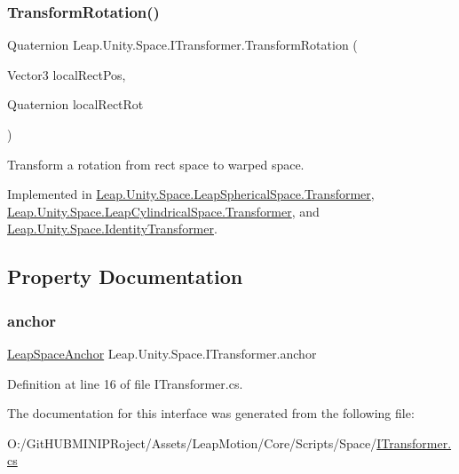\subsubsection{\texorpdfstring{TransformRotation()}{TransformRotation()}}
{\footnotesize\ttfamily Quaternion Leap.\+Unity.\+Space.\+I\+Transformer.\+Transform\+Rotation (\begin{DoxyParamCaption}\item[{Vector3}]{local\+Rect\+Pos,  }\item[{Quaternion}]{local\+Rect\+Rot }\end{DoxyParamCaption})}



Transform a rotation from rect space to warped space. 



Implemented in \mbox{\hyperlink{class_leap_1_1_unity_1_1_space_1_1_leap_spherical_space_1_1_transformer_a389407a7ecb746326153af8c11238250}{Leap.\+Unity.\+Space.\+Leap\+Spherical\+Space.\+Transformer}}, \mbox{\hyperlink{class_leap_1_1_unity_1_1_space_1_1_leap_cylindrical_space_1_1_transformer_afdb282453fb2729b9e8ee426814f6d30}{Leap.\+Unity.\+Space.\+Leap\+Cylindrical\+Space.\+Transformer}}, and \mbox{\hyperlink{class_leap_1_1_unity_1_1_space_1_1_identity_transformer_a299300bfabf6eb706fe3f876ca3384c8}{Leap.\+Unity.\+Space.\+Identity\+Transformer}}.



\subsection{Property Documentation}
\mbox{\label{interface_leap_1_1_unity_1_1_space_1_1_i_transformer_a95fc8ef0dbdc20ff39b82db2575fc10b}} 
\subsubsection{\texorpdfstring{anchor}{anchor}}
{\footnotesize\ttfamily \mbox{\hyperlink{class_leap_1_1_unity_1_1_space_1_1_leap_space_anchor}{Leap\+Space\+Anchor}} Leap.\+Unity.\+Space.\+I\+Transformer.\+anchor\hspace{0.3cm}{\ttfamily [get]}}



Definition at line 16 of file I\+Transformer.\+cs.



The documentation for this interface was generated from the following file\+:\begin{DoxyCompactItemize}
\item 
O\+:/\+Git\+H\+U\+B\+M\+I\+N\+I\+P\+Roject/\+Assets/\+Leap\+Motion/\+Core/\+Scripts/\+Space/\mbox{\hyperlink{_i_transformer_8cs}{I\+Transformer.\+cs}}\end{DoxyCompactItemize}
